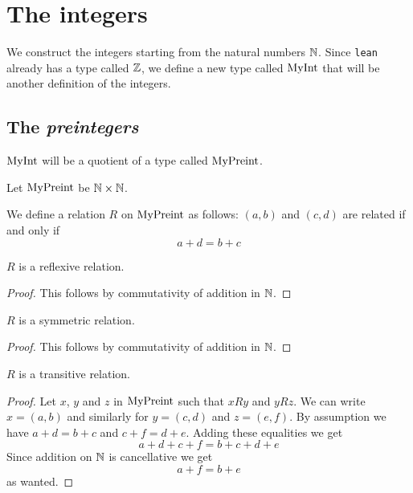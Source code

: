 \chapter{The integers}

We construct the integers starting from the natural numbers $\mathbb{N}$. Since \texttt{lean} already has a
type called $\mathbb{Z}$, we define a new type called $\mathrm{MyInt}$ that will be another definition of the integers.

\section{The \emph{preintegers}}

$\mathrm{MyInt}$ will be a quotient of a type called $\mathrm{MyPreint}$.

\begin{definition}
    \label{MyPreint}
    \leanok
    Let $\mathrm{MyPreint}$ be $\mathbb{N} \times \mathbb{N}$.
\end{definition}

\begin{definition}
    \label{MyPreint.R}
    \leanok
We define a relation $R$ on $\mathrm{MyPreint}$ as follows: $(a,b)$ and $(c, d)$ are related if and only if
\[
a + d = b + c
\]
\end{definition}

\begin{lemma}
$R$ is a reflexive relation.
    \label{MyPreint.R_refl}
    \leanok
\end{lemma}
\begin{proof}
    \leanok
    This follows by commutativity of addition in $\mathbb{N}$.
\end{proof}

\begin{lemma}
$R$ is a symmetric relation.
    \label{MyPreint.R_symm}
    \leanok
\end{lemma}
\begin{proof}
    \leanok
    This follows by commutativity of addition in $\mathbb{N}$.
\end{proof}

\begin{lemma}
$R$ is a transitive relation.
    \label{MyPreint.R_trans}
    \leanok
\end{lemma}
\begin{proof}
    \leanok
    Let $x$, $y$ and $z$ in $\mathrm{MyPreint}$ such that $x R y$ and $y R z$. We can write $x = (a,b)$ and similarly
    for $y = (c,d)$ and $z = (e,f)$. By assumption we have $a+d=b+c$ and $c+f=d+e$. Adding these equalities we get
    \[
    a+d+c+f=b+c+d+e
    \]
    Since addition on $\mathbb{N}$ is cancellative we get
    \[
    a+f = b + e
    \]
    as wanted.
\end{proof}

